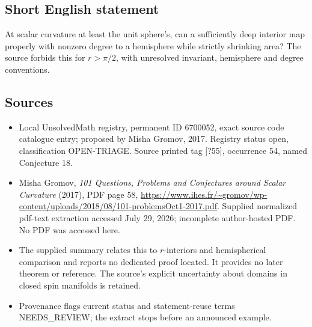\documentclass[11pt]{article}
\begin{document}
\subsection{Short English statement}
At scalar curvature at least the unit sphere's, can a sufficiently deep interior map properly with nonzero degree to a hemisphere while strictly shrinking area? The source forbids this for $r>\pi/2$, with unresolved invariant, hemisphere and degree conventions.
\subsection{Sources}
\begin{itemize}
\item Local UnsolvedMath registry, permanent ID 6700052, exact source code catalogue entry; proposed by Misha Gromov, 2017. Registry status open, classification OPEN-TRIAGE. Source printed tag [?55], occurrence 54, named Conjecture 18.
\item Misha Gromov, \emph{101 Questions, Problems and Conjectures around Scalar Curvature} (2017), PDF page 58, \url{https://www.ihes.fr/~gromov/wp-content/uploads/2018/08/101-problemsOct1-2017.pdf}. Supplied normalized pdf-text extraction accessed July 29, 2026; incomplete author-hosted PDF. No PDF was accessed here.
\item The supplied summary relates this to $r$-interiors and hemispherical comparison and reports no dedicated proof located. It provides no later theorem or reference. The source's explicit uncertainty about domains in closed spin manifolds is retained.
\item Provenance flags current status and statement-reuse terms NEEDS\_REVIEW; the extract stops before an announced example.
\end{itemize}
\end{document}
